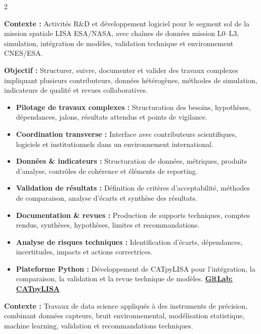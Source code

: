 \documentclass[8pt,a4paper,ragged2e,withhyper]{altacv}
\begin{document}
\begin{paracol}{2}
\divider


\textbf{Contexte :} Activités R\&D et développement logiciel pour le segment sol de la mission spatiale LISA ESA/NASA, avec chaînes de données mission L0--L3, simulation, intégration de modèles, validation technique et environnement CNES/ESA.

\textbf{Objectif :} Structurer, suivre, documenter et valider des travaux complexes impliquant plusieurs contributeurs, données hétérogènes, méthodes de simulation, indicateurs de qualité et revues collaboratives.

\begin{itemize}
  \item \textbf{Pilotage de travaux complexes :} Structuration des besoins, hypothèses, dépendances, jalons, résultats attendus et points de vigilance.
  \item \textbf{Coordination transverse :} Interface avec contributeurs scientifiques, logiciels et institutionnels dans un environnement international.
  \item \textbf{Données \& indicateurs :} Structuration de données, métriques, produits d’analyse, contrôles de cohérence et éléments de reporting.
  \item \textbf{Validation de résultats :} Définition de critères d’acceptabilité, méthodes de comparaison, analyse d’écarts et synthèse des résultats.
  \item \textbf{Documentation \& revues :} Production de supports techniques, comptes rendus, synthèses, hypothèses, limites et recommandations.
  \item \textbf{Analyse de risques techniques :} Identification d’écarts, dépendances, incertitudes, impacts et actions correctrices.
  \item \textbf{Plateforme Python :} Développement de CATpyLISA pour l’intégration, la comparaison, la validation et la revue technique de modèles.
  \textcolor{DarkPastelRed}{\href{https://gitlab.oca.eu/gboileau/lisa_l3_tools}{\bf GitLab: CATpyLISA}}
\end{itemize}

\divider


\textbf{Contexte :} Travaux de data science appliqués à des instruments de précision, combinant données capteurs, bruit environnemental, modélisation statistique, machine learning, validation et recommandations techniques.


\end{paracol}
\end{document}

